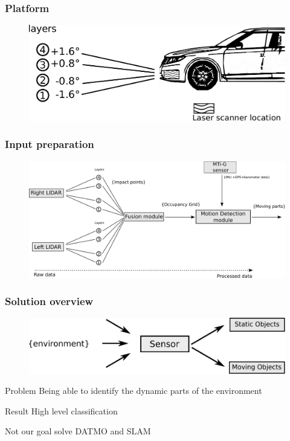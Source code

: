 \documentclass{beamer}
\begin{document}
\begin{frame}
	\end{frame}

	\begin{frame}
		\frametitle{Platform}
		\begin{figure}[h]
			\center
			\includegraphics[scale=0.4]{../img/fig:demonstrator:lateral}
		\end{figure}
	\end{frame}

	\begin{frame}
		\frametitle{Input preparation}
		\begin{figure}[h]
			\center
			\includegraphics[scale=0.18]{../img/fig:motion:framework}
		\end{figure}
	
	\end{frame}

	\begin{frame}
		\frametitle{Solution overview}
		\begin{figure}[h]
			\center
			\includegraphics[scale=0.5]{img/fig:problem}
		 \end{figure}
		 
		\begin{block}{Problem}
			 Being able to identify the dynamic parts of the environment
		\end{block}
		 
		\begin{block}{Result}
			High level classification
		\end{block}				 

		\begin{alertblock}{Not our goal}
			solve DATMO and SLAM
		\end{alertblock}
	\end{frame}
\end{document}
